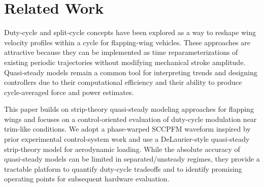 \section{Related Work}
Duty-cycle and split-cycle concepts have been explored as a way to reshape wing velocity profiles within a cycle for flapping-wing vehicles.
These approaches are attractive because they can be implemented as time reparameterizations of existing periodic trajectories without modifying mechanical stroke amplitude.
Quasi-steady models remain a common tool for interpreting trends and designing controllers due to their computational efficiency and their ability to produce cycle-averaged force and power estimates.

This paper builds on strip-theory quasi-steady modeling approaches for flapping wings and focuses on a control-oriented evaluation of duty-cycle modulation near trim-like conditions.
We adopt a phase-warped SCCPFM waveform inspired by prior experimental control-system work and use a DeLaurier-style quasi-steady strip-theory model for aerodynamic loading.
While the absolute accuracy of quasi-steady models can be limited in separated/unsteady regimes, they provide a tractable platform to quantify duty-cycle tradeoffs and to identify promising operating points for subsequent hardware evaluation.
